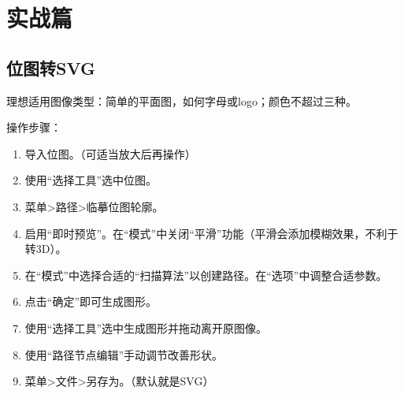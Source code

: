 \section{实战篇}

\subsection{位图转SVG}
\begin{intro}
    理想适用图像类型：简单的平面图，如何字母或logo；颜色不超过三种。
\end{intro}
操作步骤：
\begin{enumerate}
    \item 导入位图。（可适当放大后再操作）
    \item 使用“选择工具”选中位图。
    \item 菜单>路径>临摹位图轮廓。
    \item 启用“即时预览”。在“模式”中关闭“平滑”功能（平滑会添加模糊效果，不利于转3D）。
    \item 在“模式”中选择合适的“扫描算法”以创建路径。在“选项”中调整合适参数。
    \item 点击“确定”即可生成图形。
    \item 使用“选择工具”选中生成图形并拖动离开原图像。
    \item 使用“路径节点编辑”手动调节改善形状。
    \item 菜单>文件>另存为。（默认就是SVG）
\end{enumerate}
